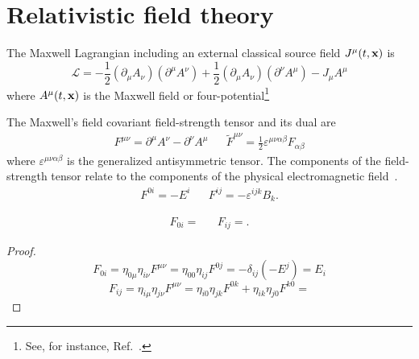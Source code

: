 \section{Relativistic field theory}

\begin{definition}
	The Maxwell Lagrangian including an external classical source field $J^\mu(t,\vb{x})$ is
	\begin{equation}
		\mathcal{L}
		=
		-
		\frac{1}{2}
		(\partial_\mu A_\nu)
		(\partial^\mu A^\nu)
		+
		\frac{1}{2}
		(\partial_\mu A_\nu)
		(\partial^\nu A^\mu)
		-
		J_\mu A^\mu
		\label{eq:mw_lagrangian}
	\end{equation}
	where $A^\mu(t,\vb{x})$ is the Maxwell field or four-potential\footnote{See, for instance, Ref.~\cite[p.~339]{Srednicki2007}.}
\end{definition}
\begin{definition}
	The Maxwell's field covariant field-strength tensor and its dual are
	\begin{align}
		F^{\mu\nu}
		=
		\partial^\mu A^\nu
		-
		\partial^\nu A^\mu
		&&
		\tilde{F}^{\mu\nu}
		=
		\frac{1}{2}
		\varepsilon^{\mu\nu\alpha\beta}
		F_{\alpha\beta}
	\end{align}
	where $\varepsilon^{\mu\nu\alpha\beta}$ is the generalized antisymmetric tensor.
	The components of the field-strength tensor relate to the components of the physical electromagnetic field~\cite[p.~336]{Srednicki2007}.
	\begin{align}
		F^{0i}
		=
		-E^i
		&&
		F^{ij}
		=
		-\varepsilon^{ijk}B_k
		\label{eq:mw_field_strength_components}
		.
	\end{align}
\end{definition}
\begin{lemma}
	\begin{align}
		F_{0i}
		=
		&&
		F_{ij}
		=
		.
	\end{align}	
\end{lemma}
\begin{proof}
	\begin{equation*}
		F_{0i}
		=
		\eta_{0\mu}
		\eta_{i\nu}
		F^{\mu\nu}
		=
		\eta_{00}
		\eta_{ij}
		F^{0j}
		=
		-
		\delta_{ij}
		(-E^j)
		=
		E_i		
	\end{equation*}
	\begin{equation*}
		F_{ij}
		=
		\eta_{i\mu}
		\eta_{j\nu}
		F^{\mu\nu}
		=
		\eta_{i0}
		\eta_{jk}
		F^{0k}
		+
		\eta_{ik}
		\eta_{j0}
		F^{k0}
		=
	\end{equation*}
\end{proof}
